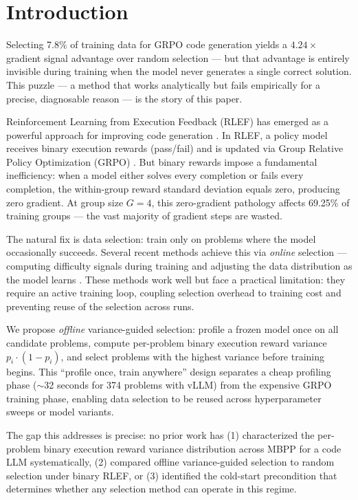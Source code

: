 \section{Introduction}

Selecting 7.8\% of training data for GRPO code generation yields a $4.24\times$ gradient signal advantage over random selection --- but that advantage is entirely invisible during training when the model never generates a single correct solution. This puzzle --- a method that works analytically but fails empirically for a precise, diagnosable reason --- is the story of this paper.

Reinforcement Learning from Execution Feedback (RLEF) has emerged as a powerful approach for improving code generation \citep{Gehring2024RLEF}. In RLEF, a policy model receives binary execution rewards (pass/fail) and is updated via Group Relative Policy Optimization (GRPO) \citep{Shao2024DeepSeekMath}. But binary rewards impose a fundamental inefficiency: when a model either solves every completion or fails every completion, the within-group reward standard deviation equals zero, producing zero gradient. At group size $G=4$, this zero-gradient pathology affects 69.25\% of training groups \citep{Nie2026GradientStarvation} --- the vast majority of gradient steps are wasted.

The natural fix is data selection: train only on problems where the model occasionally succeeds. Several recent methods achieve this via \textit{online} selection --- computing difficulty signals during training and adjusting the data distribution as the model learns \citep{Jiang2026VIGOR,Baroian2026PromptReplay,Sun2025DataEfficiency,Cui2026LZE}. These methods work well but face a practical limitation: they require an active training loop, coupling selection overhead to training cost and preventing reuse of the selection across runs.

We propose \textit{offline} variance-guided selection: profile a frozen model once on all candidate problems, compute per-problem binary execution reward variance $p_i \cdot (1-p_i)$, and select problems with the highest variance before training begins. This ``profile once, train anywhere'' design separates a cheap profiling phase ($\sim$32 seconds for 374 problems with vLLM) from the expensive GRPO training phase, enabling data selection to be reused across hyperparameter sweeps or model variants.

The gap this addresses is precise: no prior work has (1) characterized the per-problem binary execution reward variance distribution across MBPP for a code LLM systematically, (2) compared offline variance-guided selection to random selection under binary RLEF, or (3) identified the cold-start precondition that determines whether any selection method can operate in this regime.

